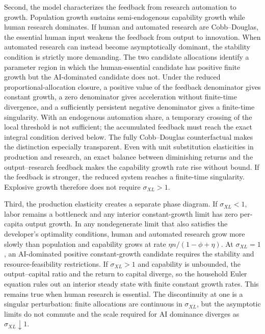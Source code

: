 Second, the model characterizes the feedback from research automation to growth.
Population growth sustains semi-endogenous capability growth while human research
dominates. If human and automated research are Cobb--Douglas, the essential human
input weakens the feedback from output to innovation. When automated research can
instead become asymptotically dominant, the stability condition is strictly more
demanding. The two candidate allocations identify a parameter region in which the
human-essential candidate has positive finite growth but the AI-dominated candidate
does not. Under
the reduced proportional-allocation closure, a positive value of the feedback denominator gives
constant growth, a zero denominator gives acceleration without finite-time
divergence, and a sufficiently persistent negative denominator gives a finite-time
singularity. With an endogenous automation share, a temporary crossing of the local
threshold is not sufficient; the accumulated feedback must reach the exact integral
condition derived below.
The fully Cobb--Douglas counterfactual makes the distinction especially transparent.
Even with unit substitution elasticities in production and research, an exact balance
between diminishing returns and the output--research feedback makes the capability
growth rate rise without bound. If the feedback is stronger, the reduced system
reaches a finite-time singularity. Explosive growth therefore does not require
$\sigma_{XL}>1$.

Third, the production elasticity creates a separate phase diagram. If
$\sigma_{XL}<1$, labor remains a bottleneck and any interior constant-growth limit
has zero per-capita output growth. In any nondegenerate limit that also satisfies the
developer's optimality conditions, human and automated research grow more slowly
than population and capability grows at rate $\eta n/(1-\phi+\eta)$. At
$\sigma_{XL}=1$, an AI-dominated positive constant-growth candidate requires the
stability and resource-feasibility restrictions. If
$\sigma_{XL}>1$ and capability is unbounded, the output--capital ratio and the return
to capital diverge, so the household Euler equation rules out an interior steady
state with finite constant growth rates. This remains true when human research is
essential. The discontinuity at one is a singular perturbation: finite allocations
are continuous in $\sigma_{XL}$, but the asymptotic limits do not commute and the
scale required for AI dominance diverges as $\sigma_{XL}\downarrow1$.

